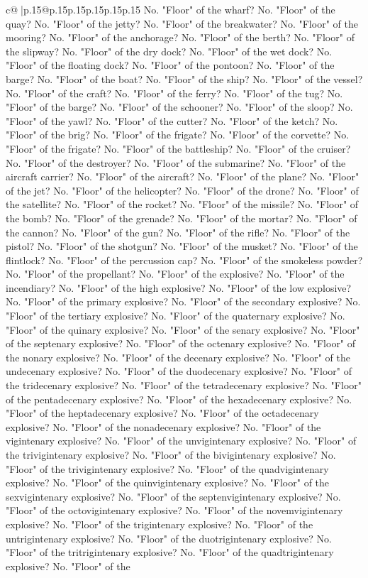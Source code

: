 \documentclass{article}
\begin{document}
{\begin{supertabular}{c@{$\;$}|p{.15\linewidth}@{}p{.15\linewidth}p{.15\linewidth}p{.15\linewidth}p{.15\linewidth}p{.15\linewidth}}
{{{No. "Floor" of the wharf? No. "Floor" of the quay? No. "Floor" of the jetty? No. "Floor" of the breakwater? No. "Floor" of the mooring? No. "Floor" of the anchorage? No. "Floor" of the berth? No. "Floor" of the slipway? No. "Floor" of the dry dock? No. "Floor" of the wet dock? No. "Floor" of the floating dock? No. "Floor" of the pontoon? No. "Floor" of the barge? No. "Floor" of the boat? No. "Floor" of the ship? No. "Floor" of the vessel? No. "Floor" of the craft? No. "Floor" of the ferry? No. "Floor" of the tug? No. "Floor" of the barge? No. "Floor" of the schooner? No. "Floor" of the sloop? No. "Floor" of the yawl? No. "Floor" of the cutter? No. "Floor" of the ketch? No. "Floor" of the brig? No. "Floor" of the frigate? No. "Floor" of the corvette? No. "Floor" of the frigate? No. "Floor" of the battleship? No. "Floor" of the cruiser? No. "Floor" of the destroyer? No. "Floor" of the submarine? No. "Floor" of the aircraft carrier? No. "Floor" of the aircraft? No. "Floor" of the plane? No. "Floor" of the jet? No. "Floor" of the helicopter? No. "Floor" of the drone? No. "Floor" of the satellite? No. "Floor" of the rocket? No. "Floor" of the missile? No. "Floor" of the bomb? No. "Floor" of the grenade? No. "Floor" of the mortar? No. "Floor" of the cannon? No. "Floor" of the gun? No. "Floor" of the rifle? No. "Floor" of the pistol? No. "Floor" of the shotgun? No. "Floor" of the musket? No. "Floor" of the flintlock? No. "Floor" of the percussion cap? No. "Floor" of the smokeless powder? No. "Floor" of the propellant? No. "Floor" of the explosive? No. "Floor" of the incendiary? No. "Floor" of the high explosive? No. "Floor" of the low explosive? No. "Floor" of the primary explosive? No. "Floor" of the secondary explosive? No. "Floor" of the tertiary explosive? No. "Floor" of the quaternary explosive? No. "Floor" of the quinary explosive? No. "Floor" of the senary explosive? No. "Floor" of the septenary explosive? No. "Floor" of the octenary explosive? No. "Floor" of the nonary explosive? No. "Floor" of the decenary explosive? No. "Floor" of the undecenary explosive? No. "Floor" of the duodecenary explosive? No. "Floor" of the tridecenary explosive? No. "Floor" of the tetradecenary explosive? No. "Floor" of the pentadecenary explosive? No. "Floor" of the hexadecenary explosive? No. "Floor" of the heptadecenary explosive? No. "Floor" of the octadecenary explosive? No. "Floor" of the nonadecenary explosive? No. "Floor" of the vigintenary explosive? No. "Floor" of the unvigintenary explosive? No. "Floor" of the trivigintenary explosive? No. "Floor" of the bivigintenary explosive? No. "Floor" of the trivigintenary explosive? No. "Floor" of the quadvigintenary explosive? No. "Floor" of the quinvigintenary explosive? No. "Floor" of the sexvigintenary explosive? No. "Floor" of the septenvigintenary explosive? No. "Floor" of the octovigintenary explosive? No. "Floor" of the novemvigintenary explosive? No. "Floor" of the trigintenary explosive? No. "Floor" of the untrigintenary explosive? No. "Floor" of the duotrigintenary explosive? No. "Floor" of the tritrigintenary explosive? No. "Floor" of the quadtrigintenary explosive? No. "Floor" of the }}}
\end{supertabular}}
\end{document}
